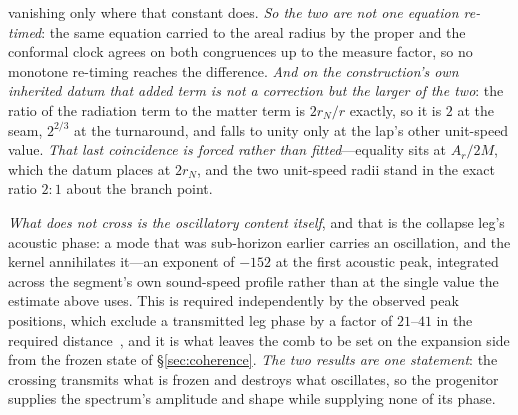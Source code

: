 \documentclass[11pt,a4paper]{article}
\theoremstyle{plain}
\theoremstyle{definition}
\theoremstyle{remark}
\begin{document}
vanishing only where that constant does. \emph{So the two are not one equation re-timed}: the same equation
carried to the areal radius by the proper and the conformal clock agrees on both congruences up to the measure
factor, so no monotone re-timing reaches the
difference.
\emph{And on the construction's own inherited datum that added term is not a correction but the larger of the
two}: the ratio of the radiation term to the matter term is $2r_{N}/r$ exactly, so it is $2$ at the seam,
$2^{2/3}$ at the turnaround, and falls to unity only at the lap's other unit-speed value. \emph{That last
coincidence is forced rather than fitted}---equality sits at $A_{r}/2M$, which the datum places at $2r_{N}$,
and the two unit-speed radii stand in the exact ratio $2{:}1$ about the branch
point.

\emph{What does not cross is the oscillatory content itself}, and that is the collapse leg's acoustic phase:
a mode that was sub-horizon earlier carries an oscillation, and the kernel annihilates it---an exponent of
$-152$ at the first acoustic peak, integrated across the segment's own sound-speed profile rather than at the
single value the estimate above uses. This is required independently by the observed peak positions, which exclude a transmitted
leg phase by a factor of $21$--$41$ in the required distance~\cite{JanzenCRframework}, and it is what leaves
the comb to be set on the expansion side from the frozen state of \S\ref{sec:coherence}. \emph{The two
results are one statement}: the crossing transmits what is frozen and destroys what oscillates, so the
progenitor supplies the spectrum's amplitude and shape while supplying none of its phase.
\end{document}
